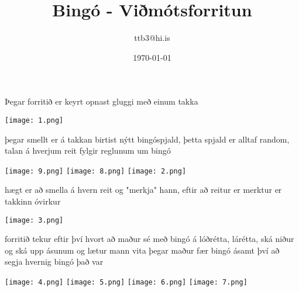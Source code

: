 \documentclass{article}
\title{Bingó - Viðmótsforritun}
\author{ttb3@hi.is}
\date{\today}
\begin{document}
\maketitle

Þegar forritið er keyrt opnast gluggi með einum takka\\
\begin{center}
    \texttt{[image: 1.png]}
\end{center}
þegar smellt er á takkan birtist nýtt bingóspjald, þetta spjald er alltaf random, talan á hverjum reit fylgir reglunum um bingó\\
\begin{center}
    \texttt{[image: 9.png]}
    \texttt{[image: 8.png]}
    \texttt{[image: 2.png]}
\end{center}
hægt er að smella á hvern reit og "merkja" hann, eftir að reitur er merktur er takkinn óvirkur
\begin{center}
    \texttt{[image: 3.png]}
\end{center}
forritið tekur eftir því hvort að maður sé með bingó á lóðrétta, lárétta, ská niður og ská upp ásunum og lætur mann vita þegar maður fær bingó ásamt því að segja hvernig bingó það var\\
\begin{center}
    \texttt{[image: 4.png]}
    \texttt{[image: 5.png]}
    \texttt{[image: 6.png]}
    \texttt{[image: 7.png]}
\end{center}
\end{document}
